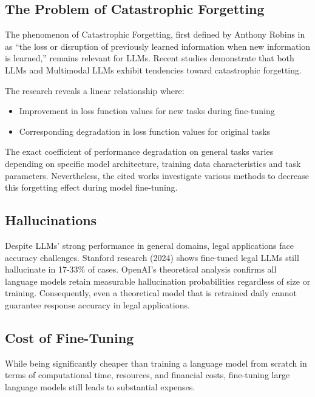 \subsection{The Problem of Catastrophic Forgetting}
The phenomenon of Catastrophic Forgetting, first defined by Anthony Robins in \cite{robinsCatastrophicForgettingRehearsal1995} 
as ``the loss or disruption of previously learned information when new information is learned,'' 
remains relevant for LLMs. 
Recent studies demonstrate that both LLMs \cite{kalajdzievskiScalingLawsForgetting2024} 
and Multimodal LLMs \cite{zhaiInvestigatingCatastrophicForgetting2024} 
exhibit tendencies toward catastrophic forgetting. 

The research reveals a linear relationship where:
\begin{itemize}
    \item Improvement in loss function values for new tasks during fine-tuning
    \item Corresponding degradation in loss function values for original tasks
\end{itemize}
The exact coefficient of performance degradation on general tasks varies depending on 
specific model architecture, training data characteristics and task parameters.
Nevertheless, the cited works investigate various methods to decrease this forgetting effect 
during model fine-tuning.

\subsection{Hallucinations}
Despite LLMs' strong performance in general domains, legal applications face accuracy challenges. 
Stanford research (2024) \cite{mageshHallucinationFreeAssessingReliability2024a} shows 
fine-tuned legal LLMs still hallucinate in 17-33\% of cases. 
OpenAI's theoretical analysis \cite{kalaiCalibratedLanguageModels2024} confirms 
all language models retain measurable hallucination probabilities regardless of size or training. 
Consequently, even a theoretical model that is retrained daily 
cannot guarantee response accuracy in legal applications.

\subsection{Cost of Fine-Tuning}

While being significantly cheaper than training a language model from scratch 
in terms of computational time, resources, and financial costs, 
fine-tuning large language models still leads to substantial expenses. 

